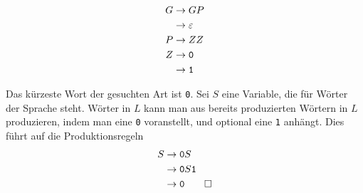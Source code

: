 \begin{loesung}
\begin{teilaufgaben}
\begin{align*}
G&\rightarrow GP\\
 &\rightarrow \varepsilon\\
P&\rightarrow ZZ\\
Z&\rightarrow {\tt 0}\\
 &\rightarrow {\tt 1}
\end{align*}
\item
Das kürzeste Wort der gesuchten Art ist {\tt 0}. Sei $S$ eine
Variable, die für Wörter der Sprache steht. Wörter in $L$
kann man aus bereits produzierten Wörtern in $L$ produzieren,
indem man  eine {\tt 0} voranstellt, und optional eine {\tt 1}
anhängt. Dies führt auf die Produktionsregeln
\begin{align*}
S&\rightarrow {\tt 0}S\\
 &\rightarrow {\tt 0}S{\tt 1}\\
 &\rightarrow {\tt 0}
\qedhere
\end{align*}
\end{teilaufgaben}
\end{loesung}
